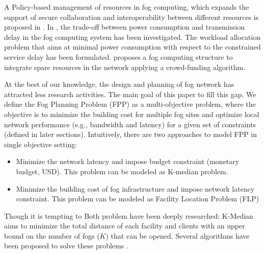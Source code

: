 \documentclass[10pt,journal,compsoc]{IEEEtran}
\begin{document}

A Policy-based management of resources in fog computing, which expands the support of secure collaboration and interoperability between different resources is proposed in \cite{secme}. In \cite{fcworkload}, the trade-off between power consumption and transmission delay in the fog computing system has been investigated. The workload allocation problem that aims at minimal power consumption with respect to the constrained service delay has been formulated. \cite{SUN2017687} proposes a fog computing structure to integrate spare resources in the network applying a crowd-funding algorithm.

At the best of our knowledge, the design and planning of fog network has attracted less research activities. The main goal of this paper to fill this gap. We define the Fog Planning Problem (FPP) as a multi-objective problem, where the objective is to minimize the building cost for multiple fog sites and optimize local network performance (e.g., bandwidth and latency) for a given set of constraints (defined in later sections).
%
%
\iffalse
Intuitively, there are two approaches to model FPP in single objective setting:
\begin{itemize}
\item Minimize the network latency and impose budget constraint (monetary budget, USD). This problem can be modeled as K-median problem.
\item Minimize the building cost of fog infrastructure and impose network latency constraint. This problem can be modeled as Facility Location Problem (FLP)
\end{itemize}
Though it is tempting to 
Both problem have been deeply researched: K-Median aims to minimize the total distance of each facility and clients with an upper bound on the number of fogs ($K$) that can be opened. Several algorithms have been proposed to solve these problems \cite{Bartal:1996:PAM:874062.875536, Charikar:1999:CAA:301250.301257, Arya:2001:LSH:380752.380755}.
\end{document}
